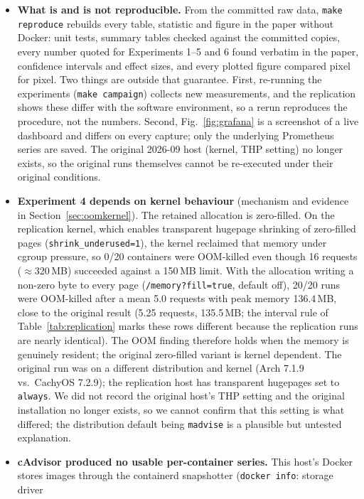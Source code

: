 \documentclass[conference]{IEEEtran}
\begin{document}
\begin{itemize}
monitoring overhead on this host; they cannot rule out small effects.
\item \textbf{What is and is not reproducible.} From the committed raw data,
\texttt{make reproduce} rebuilds every table, statistic and figure in the paper
without Docker: unit tests, summary tables checked against the committed copies,
every number quoted for Experiments 1--5 and 6 found verbatim in the paper,
confidence intervals and effect sizes, and every plotted figure compared pixel
for pixel. Two things are outside that guarantee. First, re-running the
experiments (\texttt{make campaign}) collects new measurements, and the
replication shows these differ with the software environment, so a rerun
reproduces the procedure, not the numbers. Second, Fig.~\ref{fig:grafana} is a
screenshot of a live dashboard and differs on every capture; only the underlying
Prometheus series are saved. The original 2026-09 host (kernel, THP setting) no
longer exists, so the original runs themselves cannot be re-executed under their
original conditions.
\item \textbf{Experiment 4 depends on kernel behaviour} (mechanism and
evidence in Section~\ref{sec:oomkernel}). The retained
allocation is zero-filled. On the replication kernel, which enables transparent
hugepage shrinking of zero-filled pages (\texttt{shrink\_underused=1}), the
kernel reclaimed that memory under cgroup pressure, so 0/20 containers were
OOM-killed even though 16 requests ($\approx$320\,MB) succeeded against a
150\,MB limit. With the allocation writing a non-zero byte to every page
(\texttt{/memory?fill=true}, default off), 20/20 runs were OOM-killed after a
mean 5.0 requests with peak memory 136.4\,MB, close to the original
result (5.25 requests, 135.5\,MB; the interval rule of Table~\ref{tab:replication}
marks these rows different because the replication runs are nearly identical). The OOM finding therefore holds when the
memory is genuinely resident; the original zero-filled variant is kernel
dependent. The original run was on a different distribution and kernel
(Arch 7.1.9 vs.\ CachyOS 7.2.9); the replication host has transparent
hugepages set to \texttt{always}. We did not record the original host's THP
setting and the original installation no longer exists, so we cannot confirm
that this setting is what differed; the distribution default being
\texttt{madvise} is a plausible but untested explanation.
\item \textbf{cAdvisor produced no usable per-container series.} This host's Docker
stores images through the containerd snapshotter (\texttt{docker info}: storage driver

\end{itemize}
\end{document}
